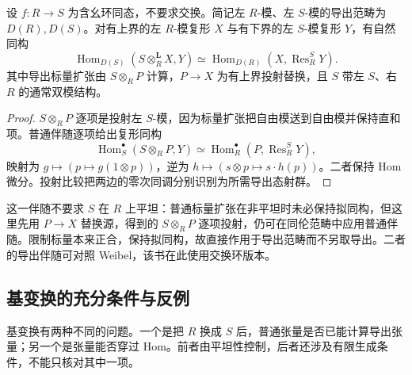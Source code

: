 \begin{proposition}\label{b4:prop:derived-extension-restriction}
	设 \(f:R\to S\) 为含幺环同态，不要求交换。简记左 \(R\)-模、左 \(S\)-模的导出范畴为 \(D(R),D(S)\)。对有上界的左 \(R\)-模复形 \(X\) 与有下界的左 \(S\)-模复形 \(Y\)，有自然同构
	\[
		\operatorname{Hom}_{D(S)}(S\otimes_R^{\mathbf L}X,Y) \simeq\operatorname{Hom}_{D(R)}(X,\operatorname{Res}_R^S Y).
	\]
	其中导出标量扩张由 \(S\otimes_RP\) 计算，\(P\to X\) 为有上界投射替换，且 \(S\) 带左 \(S\)、右 \(R\) 的通常双模结构。
\end{proposition}
\begin{proof}
	\(S\otimes_RP\) 逐项是投射左 \(S\)-模，因为标量扩张把自由模送到自由模并保持直和项。普通伴随逐项给出复形同构
	\[
		\operatorname{Hom}_S^\bullet(S\otimes_RP,Y) \simeq\operatorname{Hom}_R^\bullet(P,\operatorname{Res}_R^S Y),
	\]
	映射为 \(g\mapsto(p\mapsto g(1\otimes p))\)，逆为 \(h\mapsto(s\otimes p\mapsto s\cdot h(p))\)。二者保持 Hom 微分。投射比较把两边的零次同调分别识别为所需导出态射群。
\end{proof}

这一伴随不要求 \(S\) 在 \(R\) 上平坦：普通标量扩张在非平坦时未必保持拟同构，但这里先用 \(P\to X\) 替换源，得到的 \(S\otimes_RP\) 逐项投射，仍可在同伦范畴中应用普通伴随。限制标量本来正合，保持拟同构，故直接作用于导出范畴而不另取导出。二者的导出伴随可对照 Weibel\cite[Theorem 10.7.6]{Weibel1994HomologicalAlgebra}，该书在此使用交换环版本。

\subsection{基变换的充分条件与反例}
\label{b4:subsec:1803:03}

基变换有两种不同的问题。一个是把 \(R\) 换成 \(S\) 后，普通张量是否已能计算导出张量；另一个是张量能否穿过 Hom。前者由平坦性控制，后者还涉及有限生成条件，不能只核对其中一项。

